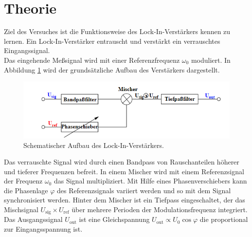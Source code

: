 \section{Theorie}
\label{sec:Theorie}
Ziel des Versuches ist die Funktionsweise des Lock-In-Verstärkers kennen zu lernen.
Ein Lock-In-Verstärker entrauscht und verstärkt ein verrauschtes Eingangssignal.\\
Das eingehende Meßsignal wird mit einer Referenzfrequenz $\omega_0$ moduliert.
In Abbildung \ref{fig:aug} wird der grundsätzliche Aufbau des Verstärkers dargestellt.
\begin{figure}
    \centering
    \caption{Schematischer Aufbau des Lock-In-Verstärkers.\cite{v303}}
    \label{fig:aug}
    \includegraphics[width = 0.6 \textwidth]{Pics/gauf.png}
\end{figure}
Das verrauschte Signal wird durch einen Bandpass von Rauschanteilen höherer und tieferer Frequenzen befreit. In einem Mischer
wird mit einem Referenzsignal der Frequenz $\omega_0$ das Signal multipliziert. Mit Hilfe eines Phasenverschiebers kann die Phasenlage $\varphi$
des Referenzsignals variiert werden und so mit dem Signal synchronisiert werden. Hinter dem Mischer ist ein Tiefpass eingeschaltet, der das Mischsignal $U_\text{sig} \times
U_\text{ref}$ über mehrere Perioden der Modulationsfrequenz integriert. Das Ausgangssignal $U_\text{out}$ ist eine Gleichspannung
$U_\text{out} \propto U_0 \cos \varphi $ die proportional zur Eingangsspannung ist.